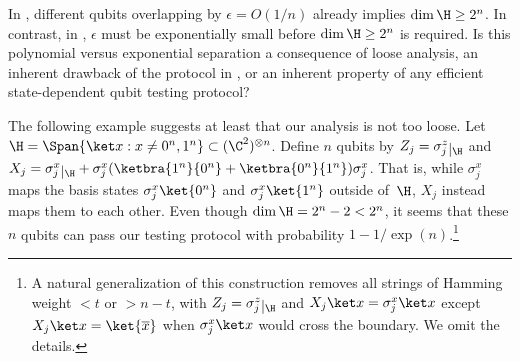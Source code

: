 \documentclass[11pt]{article}
\begin{document}
\begin{remark}
In , different qubits overlapping by $\epsilon = O(1/n)$ already implies $\dim \H \geq 2^n$.  In contrast, in , $\epsilon$ must be exponentially small before $\dim \H \geq 2^n$ is required.  Is this polynomial versus exponential separation a consequence of loose analysis, an inherent drawback of the protocol in , or an inherent property of any efficient state-dependent qubit testing protocol?  

\newcommand\restrict[1]{\raisebox{-.5ex}{$|$}{}_{#1}^{}}

The following example suggests at least that our analysis is not too loose.   Let $\H = \Span\{ \ket x : x \neq 0^n, 1^n \} \subset (\C^2)^{\otimes n}$.  Define $n$ qubits by $Z_j = \sigma^z_j \restrict{\H}$ and $X_j = \sigma^x_j \restrict{\H} + \sigma^x_j (\ketbra{1^n}{0^n} + \ketbra{0^n}{1^n}) \sigma^x_j$.  That is, while $\sigma^x_j$ maps the basis states $\sigma^x_j \ket{0^n}$ and $\sigma^x_j \ket{1^n}$ outside of~$\H$, $X_j$ instead maps them to each other.  Even though $\dim \H = 2^n - 2 < 2^n$, it seems that these $n$ qubits can pass our testing protocol with probability $1 - 1/\exp(n)$.\footnote{A natural generalization of this construction removes all strings of Hamming weight $< t$ or $> n-t$, with $Z_j = \sigma^z_j \restrict{\H}$ and $X_j \ket x = \sigma^x_j \ket x$ except $X_j \ket x = \ket{\overline x}$ when $\sigma^x_j \ket x$ would cross the boundary. We omit the details.}  
\end{remark}


\ifx\compilefullpaper\undefined  


\end{document}
